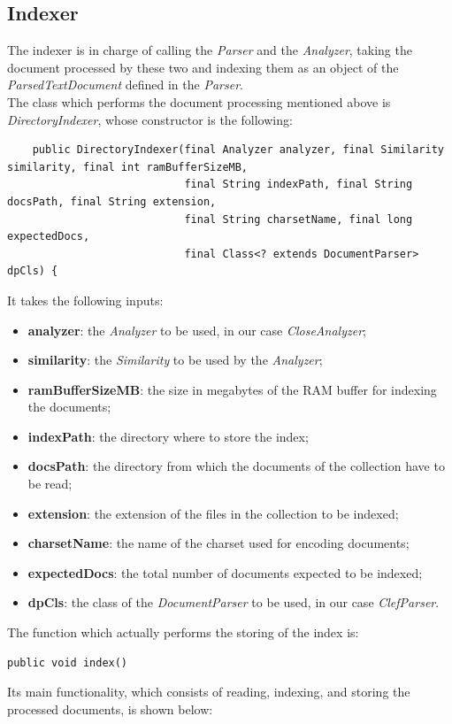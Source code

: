 \subsection{Indexer}
The indexer is in charge of calling the \textit{Parser} and the \textit{Analyzer}, taking the document processed by these two and indexing them as an object of the \textit{ParsedTextDocument} defined in the \textit{Parser}. \\
The class which performs the document processing mentioned above is \textit{DirectoryIndexer}, whose constructor is the following:
\begin{lstlisting}
    public DirectoryIndexer(final Analyzer analyzer, final Similarity similarity, final int ramBufferSizeMB,
                            final String indexPath, final String docsPath, final String extension,
                            final String charsetName, final long expectedDocs,
                            final Class<? extends DocumentParser> dpCls) {
\end{lstlisting}
It takes the following inputs:
\begin{itemize}
\item \textbf{analyzer}: the \textit{Analyzer} to be used, in our case \textit{CloseAnalyzer};
\item \textbf{similarity}: the \textit{Similarity} to be used by the \textit{Analyzer};
\item \textbf{ramBufferSizeMB}: the size in megabytes of the RAM buffer for indexing the documents;
\item \textbf{indexPath}: the directory where to store the index;
\item \textbf{docsPath}: the directory from which the documents of the collection have to be read;
\item \textbf{extension}: the extension of the files in the collection to be indexed;
\item \textbf{charsetName}: the name of the charset used for encoding documents;
\item \textbf{expectedDocs}: the total number of documents expected to be indexed;
\item \textbf{dpCls}: the class of the \textit{DocumentParser} to be used, in our case \textit{ClefParser}.
\end{itemize}
The function which actually performs the storing of the index is:
\begin{verbatim}
public void index()
\end{verbatim}
Its main functionality, which consists of reading, indexing, and storing the processed documents, is shown below:
